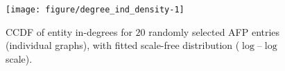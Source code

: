 \begin{knitrout}
\color{fgcolor}\begin{figure}[!htbp]

{\centering \texttt{[image: figure/degree\_ind\_density-1]} 

}

\caption[CCDF of entity in-degrees for $20$ randomly selected AFP entries (individual graphs), with fitted scale-free distribution ($\log$--$\log$ scale)]{CCDF of entity in-degrees for $20$ randomly selected AFP entries (individual graphs), with fitted scale-free distribution ($\log$--$\log$ scale).}\label{fig:degree_ind_density}
\end{figure}

\end{knitrout}
